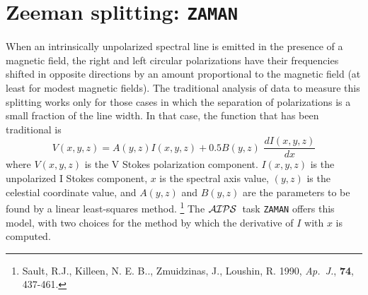 \documentclass[twoside]{article}
\newcommand{\AIPS}{{$\cal AIPS\/$}}
\begin{document}
\section{Zeeman splitting: {\tt ZAMAN}}

When an intrinsically unpolarized spectral line is emitted in the
presence of a magnetic field, the right and left circular
polarizations have their frequencies shifted in opposite directions by
an amount proportional to the magnetic field (at least for modest
magnetic fields).  The traditional analysis of data to measure this
splitting works only for those cases in which the separation of
polarizations is a small fraction of the line width.  In that case,
the function that has been traditional is
\begin{equation}
     V(x,y,z) = A(y,z) I(x,y,z) + 0.5 B(y,z)\,\, \frac{dI(x,y,z)}{dx}
\label{eqn:Zeman}
\end{equation}
where $V(x,y,z)$ is the V Stokes polarization component. $I(x,y,z)$ is
the unpolarized I Stokes component, $x$ is the spectral axis value,
$(y,z)$ is the celestial coordinate value, and $A(y,z)$ and $B(y,z)$
are the parameters to be found by a linear least-squares method.
\footnote{Sault, R.J., Killeen, N. E. B.., Zmuidzinas, J., Loushin, R.
  1990, {\it Ap.~J.}, {\bf 74}, 437-461.}  The \AIPS\ task {\tt ZAMAN}
offers this model, with two choices for the method by which the
derivative of $I$ with $x$ is computed.
\end{document}
